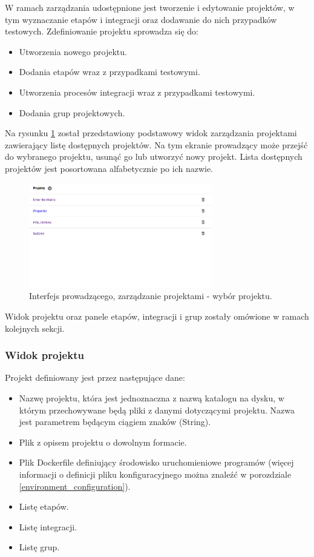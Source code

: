W ramach zarządzania udostępnione jest tworzenie i edytowanie projektów, w tym wyznaczanie etapów i integracji oraz dodawanie do nich przypadków testowych.
Zdefiniowanie projektu sprowadza się do:
\begin {itemize}
    \item Utworzenia nowego projektu.
    \item Dodania etapów wraz z przypadkami testowymi.
    \item Utworzenia procesów integracji wraz z przypadkami testowymi.
    \item Dodania grup projektowych.
\end {itemize}

Na rysunku \ref{fig:lecturer_projects_list} został przedstawiony podstawowy widok zarządzania projektami zawierający listę dostępnych projektów.
Na tym ekranie prowadzący może przejść do wybranego projektu, usunąć go lub utworzyć nowy projekt.
Lista dostępnych projektów jest posortowana alfabetycznie po ich nazwie.

\begin{figure}[h]
    \centering
    \includegraphics[width = 8cm]{chapter04/lecturer_projects_list.png}
    \caption{Interfejs prowadzącego, zarządzanie projektami - wybór projektu.}
    \label{fig:lecturer_projects_list}
\end{figure}

Widok projektu oraz panele etapów, integracji i grup zostały omówione w ramach kolejnych sekcji.

\subsubsection{Widok projektu}

Projekt definiowany jest przez następujące dane:
\begin {itemize}
    \item Nazwę projektu, która jest jednoznaczna z nazwą katalogu na dysku, w którym przechowywane będą pliki z danymi dotyczącymi projektu.
    Nazwa jest parametrem będącym ciągiem znaków (String).
    \item Plik z opisem projektu o dowolnym formacie.
    \item Plik Dockerfile definiujący środowisko uruchomieniowe programów (więcej informacji o definicji pliku konfiguracyjnego można znaleźć w porozdziale \ref{environment_configuration}).
    \item Listę etapów.
    \item Listę integracji.
    \item Listę grup.
\end {itemize}

